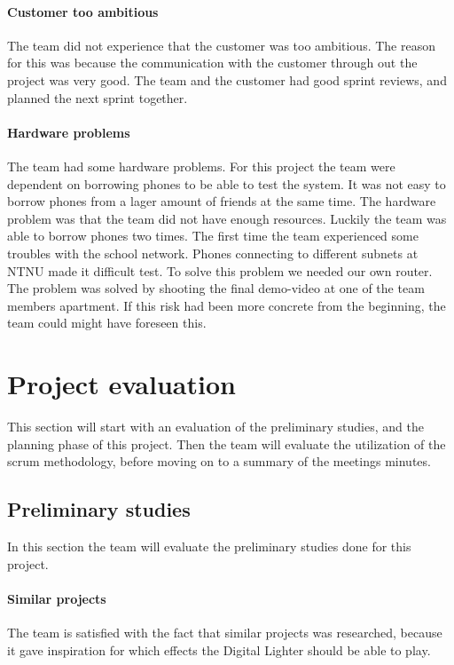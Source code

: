 \paragraph{Customer too ambitious}
The team did not experience that the customer was too ambitious. The reason for this was because the communication with the customer through out the project was very good. The team and the customer had good sprint reviews, and planned the next sprint together.

\paragraph{Hardware problems}
The team had some hardware problems. For this project the team were dependent on borrowing phones to be able to test the system. It was not easy to borrow phones from a lager amount of friends at the same time. The hardware problem was that the team did not have enough resources. Luckily the team was able to borrow phones two times. The first time the team experienced some troubles with the school network. Phones connecting to different subnets at NTNU made it difficult test. To solve this problem we needed our own router. The problem was solved by shooting the final demo-video at one of the team members apartment. If this risk had been more concrete from the beginning, the team could might have foreseen this.  

\section{Project evaluation}
This section will start with an evaluation of the preliminary studies, and the planning phase of this project.  
Then the team will evaluate the utilization of the scrum methodology, before moving on to a summary of the meetings minutes. 

\subsection{Preliminary studies}
In this section the team will evaluate the preliminary studies done for this project.
\paragraph{Similar projects} 
The team is satisfied with the fact that similar projects was researched, because it gave inspiration for which effects the Digital Lighter should be able to play. 

